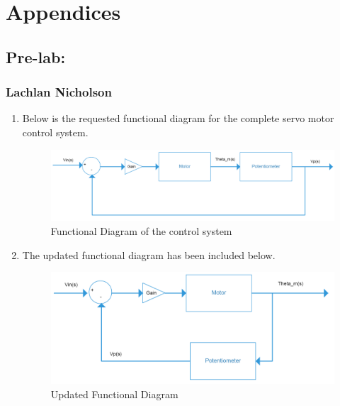 \documentclass[11pt,a4paper]{article}
\begin{document}
\pagebreak
\section{Appendices}
\subsection{Pre-lab:}
\subsubsection{Lachlan Nicholson}
\begin{enumerate}
	\item Below is the requested functional diagram for the complete servo motor control system.    
    \begin{figure}[H]
	\centering
	\includegraphics[width=.8\textwidth]{PreLach/A2a.png}
	\caption{\label{fig:funcagram}Functional Diagram of the control system}
	\end{figure}
    
    
	\item The updated functional diagram has been included below.
    \begin{figure}[H]
	\centering
	\includegraphics[width=.8\textwidth]{PreLach/A2b.png}
	\caption{\label{fig:updatedfuncagram}Updated Functional Diagram}
	\end{figure}
    
    
    

\end{enumerate}
\end{document}
